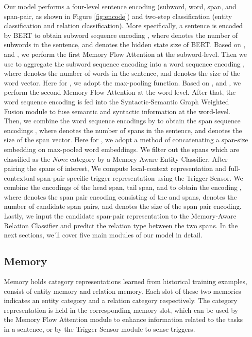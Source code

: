 \documentclass[sigconf]{acmart}
\begin{document}
Our model performs a four-level sentence encoding (subword, word, span, and span-pair,  as shown in Figure \ref{fig:encode}) and two-step classification (entity classification and relation classification). More specifically, a sentence is encoded by BERT \cite{devlin2018bert} to obtain subword sequence encoding , where  denotes the number of subwords in the sentence, and  denotes the hidden state size of BERT. 
Based on ,  and  , we perform the first Memory Flow Attention at the subword-level.
Then we use  to aggregate the subword sequence encoding into a word sequence encoding , where  denotes the number of words in the sentence, and  denotes the size of the word vector. Here for , we adopt the max-pooling function. 
Based on ,  and  , we perform the second  Memory Flow Attention at the word-level. After that, the word sequence encoding is fed into the Syntactic-Semantic Graph Weighted Fusion module to fuse semantic and syntactic information at the word-level.
Then, we combine the word sequence encodings by  to obtain the span sequence encodings , where  denotes the number of spans in the sentence, and  denotes the size of the span vector. Here for , we adopt a method of concatenating a span-size embedding on max-pooled word embeddings. We filter out the spans which are classified as the \textit{None} category by a Memory-Aware Entity Classifier. After pairing the spans of interest, We compute local-context representation  and full-contextual span-pair specific trigger representation  using the Trigger Sensor. We combine the encodings of the head span, tail span,  and  to obtain the encoding , where  denotes the span pair encoding consisting of the  and  spans,  denotes the number of candidate span pairs, and  denotes the size of the span pair encoding. 
Lastly, we input the candidate span-pair representation to the Memory-Aware Relation Classifier and predict the relation type between the two spans.
In the next sections, we'll cover five main modules of our model in detail.





\subsection{Memory} 

Memory holds category representations learned from historical training examples, consist of entity memory and relation memory. Each slot of these two memories indicates an entity category and a relation category respectively. The category representation is held in the corresponding memory slot, which can be used by the Memory Flow Attention module to enhance information related to the tasks in a sentence, or by the Trigger Sensor module to sense triggers. 
\end{document}

